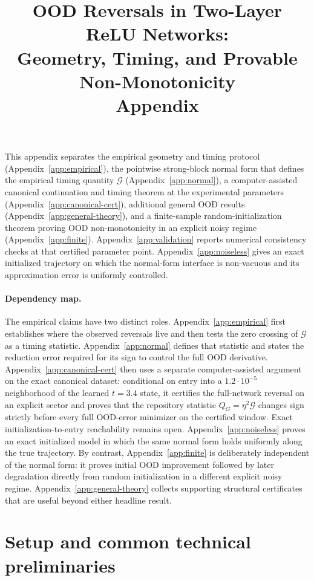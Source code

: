 \documentclass[10pt]{article}
\title{OOD Reversals in Two-Layer ReLU Networks:\\
Geometry, Timing, and Provable Non-Monotonicity\\Appendix}
\author{}\date{}
\theoremstyle{remark}\newtheorem{remark}[theorem]{Remark}
\begin{document}
\maketitle
\noindent
This appendix separates the empirical geometry and timing protocol
(Appendix~\ref{app:empirical}), the pointwise strong-block normal form that
defines the empirical timing quantity $\mathcal G$
(Appendix~\ref{app:normal}), a computer-assisted canonical continuation and
timing theorem at the experimental parameters
(Appendix~\ref{app:canonical-cert}), additional general OOD results
(Appendix~\ref{app:general-theory}), and a finite-sample random-initialization
theorem proving OOD non-monotonicity in an explicit noisy regime
(Appendix~\ref{app:finite}). Appendix~\ref{app:validation} reports numerical
consistency checks at that certified parameter point.
Appendix~\ref{app:noiseless} gives an exact initialized trajectory on which
the normal-form interface is non-vacuous and its approximation error is
uniformly controlled.

\paragraph{Dependency map.}
The empirical claims have two distinct roles. Appendix~\ref{app:empirical}
first establishes where the observed reversals live and then tests the
zero crossing of $\mathcal G$ as a timing statistic. Appendix~\ref{app:normal}
defines that statistic and states the reduction error required for its sign
to control the full OOD derivative. Appendix~\ref{app:canonical-cert} then
uses a separate computer-assisted argument on the exact canonical dataset:
conditional on entry into a $1.2\cdot10^{-5}$ neighborhood of the learned
$t=3.4$ state, it certifies the full-network reversal on an explicit sector
and proves that the repository statistic $Q_G=\eta^2\mathcal G$ changes sign
strictly before every full OOD-error minimizer on the certified window.
Exact initialization-to-entry reachability remains open. Appendix~\ref{app:noiseless}
proves an exact initialized model in which the same normal form holds uniformly
along the true trajectory. By contrast, Appendix~\ref{app:finite} is
deliberately independent of the normal form: it proves initial OOD
improvement followed by later degradation directly from random
initialization in a different explicit noisy regime. Appendix~\ref{app:general-theory}
collects supporting structural certificates that are useful beyond either
headline result.
\setcounter{tocdepth}{1}
\tableofcontents
\clearpage\appendix
\section{Setup and common technical preliminaries}\label{app:setup}
\end{document}
